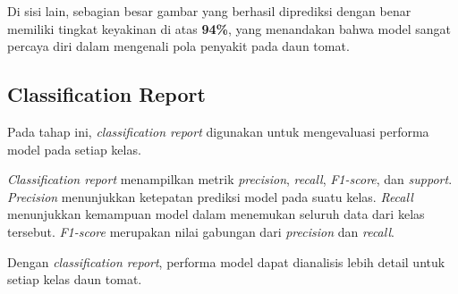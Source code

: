 Di sisi lain, sebagian besar gambar yang berhasil diprediksi dengan benar memiliki tingkat keyakinan di atas \textbf{94\%}, yang menandakan bahwa model sangat percaya diri dalam mengenali pola penyakit pada daun tomat.

\subsection{Classification Report}

Pada tahap ini, \textit{classification report} digunakan untuk mengevaluasi performa model pada setiap kelas.

\textit{Classification report} menampilkan metrik \textit{precision}, \textit{recall}, \textit{F1-score}, dan \textit{support}. \textit{Precision} menunjukkan ketepatan prediksi model pada suatu kelas. \textit{Recall} menunjukkan kemampuan model dalam menemukan seluruh data dari kelas tersebut. \textit{F1-score} merupakan nilai gabungan dari \textit{precision} dan \textit{recall}.

Dengan \textit{classification report}, performa model dapat dianalisis lebih detail untuk setiap kelas daun tomat.

